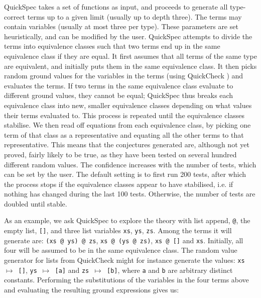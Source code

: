 QuickSpec takes a set of functions as input, and proceeds to generate all
type-correct terms up to a given limit (usually up to depth three). 
The terms may contain variables (usually at most three per type). 
These parameters are set heuristically, and can be modified by the user. 
QuickSpec attempts to divide the terms into equivalence classes such
that two terms end up in the same equivalence class if they are equal.
It first assumes that all terms of the same
type are equivalent, and initially puts them in the same equivalence class. 
It then picks random ground values for the variables in the terms
(using QuickCheck \cite{quickcheck}) and evaluates the terms.
If two terms in the same equivalence class evaluate to different
ground values, they cannot be equal; QuickSpec thus breaks each equivalence
class into new, smaller equivalence classes depending on what values
their terms evaluated to. This process is repeated until the
equivalence classes stabilise. We then read off equations from each
equivalence class, by picking one term of that class as a
representative and equating all the other terms to that representative.
This means that the conjectures
generated are, although not yet proved, fairly likely to be true, as they have been tested on several hundred different random values. The confidence increases with the number of tests, which can be set by the user. The default setting is to first run 200 tests, after which the process stops if the equivalence classes appear to have stabilised, i.e. if nothing has changed during the last 100 tests. Otherwise, the number of tests are doubled until stable.

As an example, we ask QuickSpec to explore the theory with list append,
\verb~@~, the empty list, \verb~[]~, and three list variables \verb~xs~,
\verb~ys~, \verb~zs~. Among the terms it will generate are:
\verb~(xs @ ys) @ zs~, \verb~xs @ (ys @ zs)~, \verb~xs @ []~ and \verb~xs~.
Initially, all four will be assumed to be in the same equivalence class.
The random value generator for lists from QuickCheck might for instance generate the values: \texttt{xs $\mapsto$ []}, \texttt{ys $\mapsto$ [a]} and \texttt{zs $\mapsto$ [b]}, where \texttt{a} and \texttt{b} are arbitrary distinct constants. Performing the substitutions of the variables in the four terms above and evaluating the resulting ground expressions gives us:

